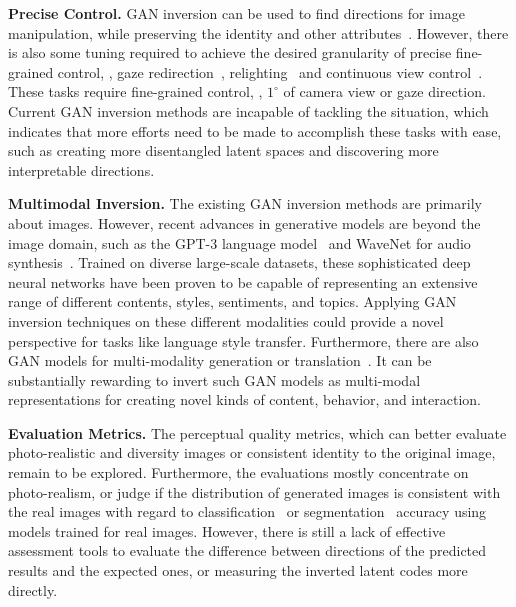 \vspace{1mm}
\noindent\textbf{Precise Control.} 
GAN inversion can be used to find directions for image manipulation, while preserving the identity and other attributes~\cite{abdal2020styleflow,shen2020interpreting}.
However, there is also some tuning required to achieve the desired granularity of precise fine-grained control, \eg, gaze redirection~\cite{ganin2016deepwarp,wood2018gaze,he2019gaze,xia2020gaze}, relighting~\cite{zhou2019deep,sun2019single,zhang2020portrait} and continuous view control~\cite{chen2019monocular}.
These tasks require fine-grained control, \ie, $1^{\circ}$ of camera view or gaze direction. 
Current GAN inversion methods are incapable of tackling the situation, which indicates that more efforts need to be made to accomplish these tasks with ease, such as creating more disentangled latent spaces and discovering more interpretable directions.

\vspace{1mm}
\noindent\textbf{Multimodal Inversion.}
The existing GAN inversion methods are primarily about images.
However, recent advances in generative models are beyond the image domain, such as the GPT-3 language model~\cite{brown2020gpt3} and WaveNet for audio synthesis~\cite{oord2016wavenet}. 
Trained on diverse large-scale datasets, these sophisticated deep neural networks have been proven to be capable of representing an extensive range of different contents, styles, sentiments, and topics.
Applying GAN inversion techniques on these different modalities could provide a novel perspective for tasks like language style transfer. 
Furthermore, there are also GAN models for multi-modality generation or translation~\cite{li2019control,jia2018speaker,prajwal2020speech}. 
It can be substantially rewarding to invert such GAN models as multi-modal representations for creating novel kinds of content, behavior, and interaction.

\vspace{1mm}
\noindent\textbf{Evaluation Metrics.}
The perceptual quality metrics, which can better evaluate photo-realistic and diversity images or consistent identity to the original image, remain to be explored.
Furthermore, the evaluations mostly concentrate on photo-realism, or judge if the distribution of generated images is consistent with the real images with regard to classification~\cite{bau2019seeing} or segmentation~\cite{voynov2020latent} accuracy using models trained for real images. 
However, there is still a lack of effective assessment tools to evaluate the difference between directions of the predicted results and the expected ones, or measuring the inverted latent codes more directly.